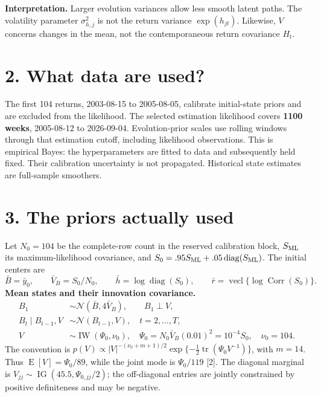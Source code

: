 \documentclass[10pt,a4paper]{article}
\newcommand{\Normal}{\mathcal N}
\newcommand{\IG}{\operatorname{IG}}
\newcommand{\IW}{\operatorname{IW}}
\newcommand{\diag}{\operatorname{diag}}
\newcommand{\vecl}{\operatorname{vecl}}
\newcommand{\E}{\operatorname E}
\begin{document}
\textbf{Interpretation.} Larger evolution variances allow less smooth latent paths.
The volatility parameter $\sigma_{h,j}^2$ is not the return variance $\exp(h_{jt})$.
Likewise, $V$ concerns changes in the mean, not the contemporaneous return covariance $H_t$.

\section*{2. What data are used?}
The first 104 returns, 2003-08-15 to 2005-08-05, calibrate initial-state priors and are
excluded from the likelihood. The selected estimation likelihood covers \textbf{1100 weeks},
2005-08-12 to 2026-09-04. Evolution-prior scales use rolling windows through that
estimation cutoff, including likelihood observations. This is empirical Bayes: the
hyperparameters are fitted to data and subsequently held fixed. Their calibration
uncertainty is not propagated. Historical state estimates are full-sample smoothers.

\clearpage
\section*{3. The priors actually used}
Let $N_0=104$ be the complete-row count in the reserved calibration block, $S_{\rm ML}$ its
maximum-likelihood covariance, and $S_0=.95S_{\rm ML}+.05\diag(S_{\rm ML})$.
The initial centers are
\[
\bar B=\bar y_0,\qquad \bar V_B=S_0/N_0,\qquad
\bar h=\log\diag(S_0),\qquad \bar r=\vecl\{\log\operatorname{Corr}(S_0)\}.
\]
\textbf{Mean states and their innovation covariance.}
\begin{align*}
B_1&\sim\Normal(\bar B,4\bar V_B),\qquad B_1\perp V,\\
B_t\mid B_{t-1},V&\sim\Normal(B_{t-1},V),\quad t=2,\ldots,T,\\
V&\sim\IW(\Psi_0,\nu_0),\quad
\Psi_0=N_0\bar V_B(0.01)^2=10^{-4}S_0,\quad\nu_0=104.
\end{align*}
The convention is $p(V)\propto |V|^{-(\nu_0+m+1)/2}
\exp\{-\tfrac12\operatorname{tr}(\Psi_0V^{-1})\}$, with $m=14$.
Thus $\E[V]=\Psi_0/89$, while the joint mode is $\Psi_0/119$ [2].
The diagonal marginal is $V_{jj}\sim\IG(45.5,\Psi_{0,jj}/2)$; the off-diagonal entries
are jointly constrained by positive definiteness and may be negative.
\end{document}
